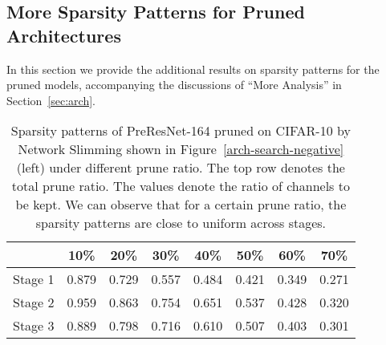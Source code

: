 \subsection{More Sparsity Patterns for Pruned Architectures}
\label{sec:additional}
In this section we provide the additional results on sparsity patterns for the pruned models, accompanying the discussions of ``More Analysis'' in Section~\ref{sec:arch}.

\setlength{\tabcolsep}{5pt}
\renewcommand{\arraystretch}{1.2}
\begin{table}[!htbp]
\centering
\small
\begin{tabular}{c|ccccccc}
\hline
       & 10\%   & 20\%   & 30\%   & 40\%   & 50\%   & 60\%   & 70\%   \\ \hline
Stage 1 & 0.879 & 0.729 & 0.557 & 0.484 & 0.421 & 0.349 & 0.271 \\
Stage 2 & 0.959 & 0.863 & 0.754 & 0.651 & 0.537 & 0.428 & 0.320 \\
Stage 3 & 0.889 & 0.798 & 0.716 & 0.610 & 0.507 & 0.403 & 0.301 \\ \hline
\end{tabular}
  \caption{
      Sparsity patterns of PreResNet-164 pruned on CIFAR-10 by Network Slimming shown in Figure~\ref{arch-search-negative} (left) under different prune ratio. The top row denotes the total prune ratio. The values denote the ratio of channels to be kept. We can observe that for a certain prune ratio, the sparsity patterns are close to uniform across stages.}
      \label{sparsity-5}
\end{table}


